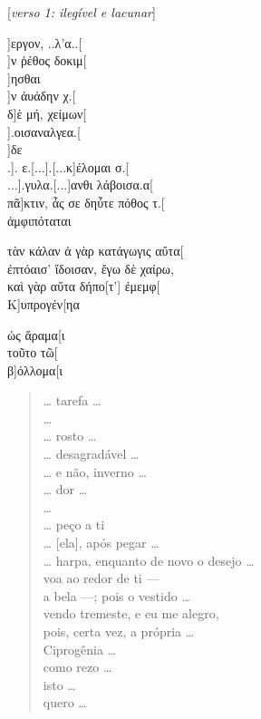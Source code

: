 \begin{gkverse}

\textnormal{[\emph{verso 1: ilegível e lacunar}]}

]εργον, ..λ’α..[\\
  ]ν ῤέθος δοκιμ[\\
    ]ησθαι\\
]ν ἀυάδην χ.[\\
δ]ὲ μή, χείμων[\\
  ].οισαναλγεα.[\\
  ]δε\\
.]. ε.[...].[...κ]έλομαι σ.[\\
...].γυλα.[...]ανθι λάβοισα.α[\\
πᾶ]κτιν, ἆς σε δηὖτε πόθος τ.[\\
ἀμφιπόταται

τὰν κάλαν ἀ γὰρ κατάγωγις αὔτα[\\
ἐπτόαισ’ ἴδοισαν, ἔγω δὲ χαίρω,\\
καὶ γὰρ αὔτα δήπο[τ’] ἐμεμφ[\\
Κ]υπρογέν[ηα

ὠς ἄραμα[ι\\
τοῦτο τῶ[\\
β]όλλομα[ι

\end{gkverse}

\pagebreak
\begin{verse}
\ldots{} tarefa \ldots{}\\
\ldots{}\\ 
\ldots{}  rosto \ldots{}\\  
\ldots{}  desagradável \ldots{}\\
\ldots{}  e não, inverno \ldots{}\\
\ldots{}  dor \ldots{}\\
\ldots{}\\ 
\ldots{}  peço a ti\\
\ldots{}  [ela], após pegar \ldots{}\\
\ldots{} harpa, enquanto de novo o desejo \ldots{}\\
voa ao redor de ti ---\\
a bela ---; pois o vestido \ldots{}\\
vendo tremeste, e eu me alegro,\\
pois, certa vez, a própria \ldots{} \\
Ciprogênia \ldots{}\\
como rezo \ldots{}\\
isto \ldots{}\\
quero \ldots{}\\
\end{verse}


